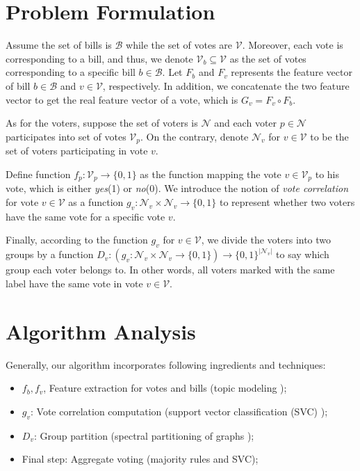 \documentclass{article} %
\begin{document}
\section{Problem Formulation}
    Assume the set of bills is $\mathcal B$ while the set of votes are $\mathcal V$. Moreover, each vote is corresponding to a bill, and thus, we denote $\mathcal V_b \subseteq \mathcal V$ as the set of votes corresponding to a specific bill $b \in \mathcal B$. Let $F_b$ and $F_v$ represents the feature vector of bill $b \in \mathcal B$ and $v \in \mathcal V$, respectively. In addition, we concatenate the two feature vector to get the real feature vector of a vote, which is $G_v = F_v \circ F_b$.
    
    As for the voters, suppose the set of voters is $\mathcal N$ and each voter $p \in \mathcal N$ participates into set of votes $\mathcal V_p$. On the contrary, denote $\mathcal N_v$ for $v \in \mathcal V$ to be the set of voters participating in vote $v$. 
    
    Define function $f_p: \mathcal V_p \to \{0,1\}$ as the function mapping the vote $v \in \mathcal V_p$ to his vote, which is either {\em yes}(1) or {\em no}(0). We introduce the notion of {\em vote correlation} for vote $v \in \mathcal V$ as a function $g_v: \mathcal N_v \times \mathcal N_v \to \{0, 1\}$ to represent whether two voters have the same vote for a specific vote $v$.
    
    Finally, according to the function $g_v$ for $v \in \mathcal V$, we divide the voters into two groups by a function $D_v : (g_v: \mathcal N_v \times \mathcal N_v \to \{0, 1\}) \to \{0, 1\}^{|\mathcal N_v|}$ to say which group each voter belongs to. In other words, all voters marked with the same label have the same vote in vote $v \in \mathcal V$.
    
\section{Algorithm Analysis}

Generally, our algorithm incorporates following ingredients and techniques:
\begin{itemize}
    \item $f_b, f_v$, Feature extraction for votes and bills (topic modeling \cite{graham2012getting,conf/icml/AroraGHMMSWZ13});
    \item $g_v$: Vote correlation computation (support vector classification (SVC) \cite{hsu2003practical});
    \item $D_v$: Group partition (spectral partitioning of graphs \cite{mcsherry2001spectral,kumar2010clustering});
    \item Final step: Aggregate voting (majority rules \cite{mcgann2004tyranny} and SVC);
\end{itemize}
\end{document}
